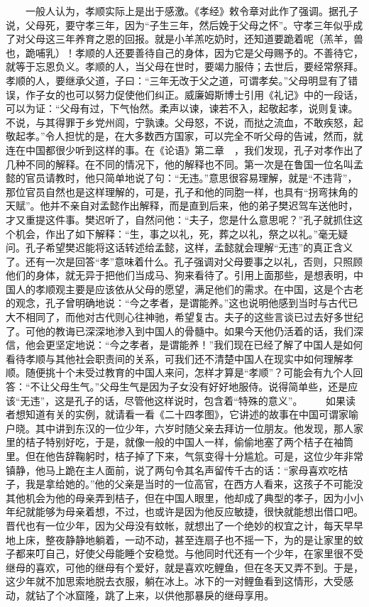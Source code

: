 \documentclass[12pt,oneside]{book}
\begin{document}
\begin{common-format}
　　一般人认为，孝顺实际上是出于感激。《孝经》敕令章对此作了强调。据孔子说，父母死，要守孝三年，因为“子生三年，然后娩于父母之怀”。守孝三年似乎成了对父母这三年养育之恩的回报。就是小羊羔吃奶时，还知道要跪着呢（羔羊，兽也，跪哺乳）！孝顺的人还要善待自己的身体，因为它是父母赐予的。不善待它，就等于忘恩负义。孝顺的人，当父母在世时，要竭力服侍；去世后，要经常祭拜。孝顺的人，要继承父道，子曰：“三年无改于父之道，可谓孝矣。”父母明显有了错误，作子女的也可以努力促使他们纠正。威廉姆斯博士引用《礼记》中的一段话，可以为证：“父母有过，下气怡然。柔声以谏，谏若不入，起敬起孝，说则复谏。不说，与其得罪于乡党州闾，宁孰谏。父母怒，不说，而挞之流血，不敢疾怒，起敬起孝。”令人担忧的是，在大多数西方国家，可以完全不听父母的告诫，然而，就连在中国都很少听到这样的事。在《论语》第二章　，我们发现，孔子对孝作出了几种不同的解释。在不同的情况下，他的解释也不同。第一次是在鲁国一位名叫孟懿的官员请教时，他只简单地说了句：“无违。”意思很容易理解，就是“不违背”，那位官员自然也是这样理解的，可是，孔子和他的同胞一样，也具有“拐弯抹角的天赋”。他并不亲自对孟懿作出解释，而是直到后来，他的弟子樊迟驾车送他时，才又重提这件事。樊迟听了，自然问他：“夫子，您是什么意思呢？”孔子就抓住这个机会，作出了如下解释：“生，事之以礼，死，葬之以礼，祭之以礼。”毫无疑问。孔子希望樊迟能将这话转述给孟懿，这样，孟懿就会理解“无违”的真正含义了。还有一次是回答“孝”意味着什么。孔子强调对父母要事之以礼，否则，只照顾他们的身体，就无异于把他们当成马、狗来看待了。引用上面那些，是想表明，中国人的孝顺观主要是应该依从父母的愿望，满足他们的需求。在中国，这是个古老的观念，孔子曾明确地说：“今之孝者，是谓能养。”这也说明他感到当时与古代已大不相同了，而他对古代则心往神驰，希望复古。夫子的这些言谈已过去好多世纪了。可他的教诲已深深地渗入到中国人的骨髓中。如果今天他仍活着的话，我们深信，他会更坚定地说：“今之孝者，是谓能养！”我们现在已经了解了中国人是如何看待孝顺与其他社会职责间的关系，可我们还不清楚中国人在现实中如何理解孝顺。随便挑十个未受过教育的中国人来问，怎样才算是“孝顺”？可能会有九个人回答：“不让父母生气。”父母生气是因为子女没有好好地服侍。说得简单些，还是应该“无违”，这是孔子的话，尽管他这样说时，包含着“特殊的意义”。 
　　如果读者想知道有关的实例，就请看一看《二十四孝图》，它讲述的故事在中国可谓家喻户晓。其中讲到东汉的一位少年，六岁时随父亲去拜访一位朋友。他发现，那人家里的桔子特别好吃，于是，就像一般的中国人一样，偷偷地塞了两个桔子在袖筒里。但在他告辞鞠躬时，桔子掉了下来，气氛变得十分尴尬。可是，这位少年非常镇静，他马上跪在主人面前，说了两句令其名声留传千古的话：“家母喜欢吃桔子，我是拿给她的。”他的父亲是当时的一位高官，在西方人看来，这孩子不可能没其他机会为他的母亲弄到桔子，但在中国人眼里，他却成了典型的孝子，因为小小年纪就能够为母亲着想，不过，也或许是因为他反应敏捷，很快就能想出借口吧。晋代也有一位少年，因为父母没有蚊帐，就想出了一个绝妙的权宜之计，每天早早地上床，整夜静静地躺着，一动不动，甚至连扇子也不摇一下，为的是让家里的蚊子都来叮自己，好使父母能睡个安稳觉。与他同时代还有一个少年，在家里很不受继母的喜欢，可他的继母有个爱好，就是喜欢吃鲤鱼，但在冬天又弄不到。于是，这少年就不加思索地脱去衣服，躺在冰上。冰下的一对鲤鱼看到这情形，大受感动，就钻了个冰窟隆，跳了上来，以供他那暴戾的继母享用。 

\end{common-format}
\end{document}
